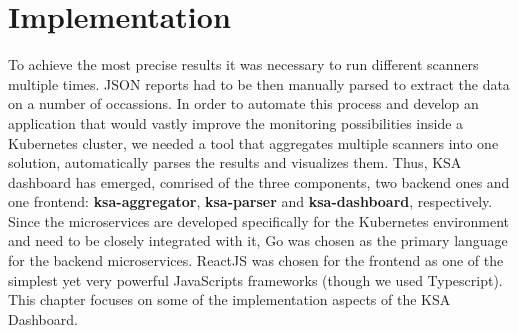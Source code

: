 \chapter{Implementation}
\label{chap:implementation}

To achieve the most precise results it was necessary to run different scanners multiple times. JSON reports had to be then manually parsed to extract the data on a number of occassions. In order to automate this process and develop an application that would vastly improve the monitoring possibilities inside a Kubernetes cluster, we needed a tool that aggregates multiple scanners into one solution, automatically parses the results and visualizes them. Thus, KSA dashboard has emerged, comrised of the three components, two backend ones and one frontend: \textbf{ksa-aggregator}, \textbf{ksa-parser} and \textbf{ksa-dashboard}, respectively. Since the microservices are developed specifically for the Kubernetes environment and need to be closely integrated with it, Go was chosen as the primary language for the backend microservices. ReactJS was chosen for the frontend as one of the simplest yet very powerful JavaScripts frameworks (though we used Typescript). This chapter focuses on some of the implementation aspects of the KSA Dashboard. 






